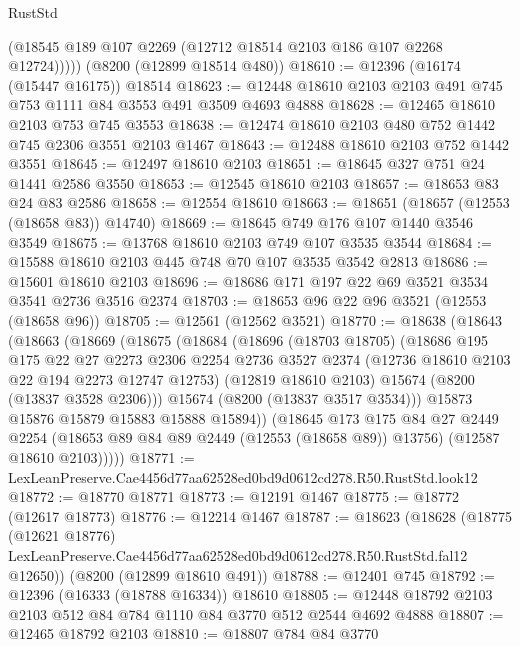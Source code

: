 \begin{lexlean}{RustStd}
\begin{coremodule}
          (@18545 @189 @107 @2269 (@12712 @18514 @2103 @186 @107 @2268 @12724)))))
    (@8200 (@12899 @18514 @480))
@18610 := @12396 (@16174 (@15447 @16175)) @18514
@18623 := @12448 @18610 @2103 @2103 @491 @745 @753 @1111 @84 @3553 @491 @3509 @4693 @4888
@18628 := @12465 @18610 @2103 @753 @745 @3553
@18638 := @12474 @18610 @2103 @480 @752 @1442 @745 @2306 @3551 @2103 @1467
@18643 := @12488 @18610 @2103 @752 @1442 @3551
@18645 := @12497 @18610 @2103
@18651 := @18645 @327 @751 @24 @1441 @2586 @3550
@18653 := @12545 @18610 @2103
@18657 := @18653 @83 @24 @83 @2586
@18658 := @12554 @18610
@18663 := @18651 (@18657 (@12553 (@18658 @83)) @14740)
@18669 := @18645 @749 @176 @107 @1440 @3546 @3549
@18675 := @13768 @18610 @2103 @749 @107 @3535 @3544
@18684 := @15588 @18610 @2103 @445 @748 @70 @107 @3535 @3542 @2813
@18686 := @15601 @18610 @2103
@18696 := @18686 @171 @197 @22 @69 @3521 @3534 @3541 @2736 @3516 @2374
@18703 := @18653 @96 @22 @96 @3521 (@12553 (@18658 @96))
@18705 := @12561 (@12562 @3521)
@18770 := @18638
    (@18643
      (@18663
        (@18669
          (@18675
            (@18684
              (@18696
                (@18703 @18705)
                (@18686
                  @195
                  @175
                  @22
                  @27
                  @2273
                  @2306
                  @2254
                  @2736
                  @3527
                  @2374
                  (@12736 @18610 @2103 @22 @194 @2273 @12747 @12753)
                  (@12819 @18610 @2103)
                  @15674
                  (@8200 (@13837 @3528 @2306)))
                @15674
                (@8200 (@13837 @3517 @3534)))
              @15873
              @15876
              @15879
              @15883
              @15888
              @15894))
          (@18645
            @173
            @175
            @84
            @27
            @2449
            @2254
            (@18653 @89 @84 @89 @2449 (@12553 (@18658 @89)) @13756)
            (@12587 @18610 @2103)))))
@18771 := LexLeanPreserve.Cae4456d77aa62528ed0bd9d0612cd278.R50.RustStd.look12
@18772 := @18770 @18771
@18773 := @12191 @1467
@18775 := @18772 (@12617 @18773)
@18776 := @12214 @1467
@18787 := @18623
    (@18628
      (@18775
        (@12621 @18776)
        LexLeanPreserve.Cae4456d77aa62528ed0bd9d0612cd278.R50.RustStd.fal12
        @12650))
    (@8200 (@12899 @18610 @491))
@18788 := @12401 @745
@18792 := @12396 (@16333 (@18788 @16334)) @18610
@18805 := @12448 @18792 @2103 @2103 @512 @84 @784 @1110 @84 @3770 @512 @2544 @4692 @4888
@18807 := @12465 @18792 @2103
@18810 := @18807 @784 @84 @3770

\end{coremodule}
\end{lexlean}
